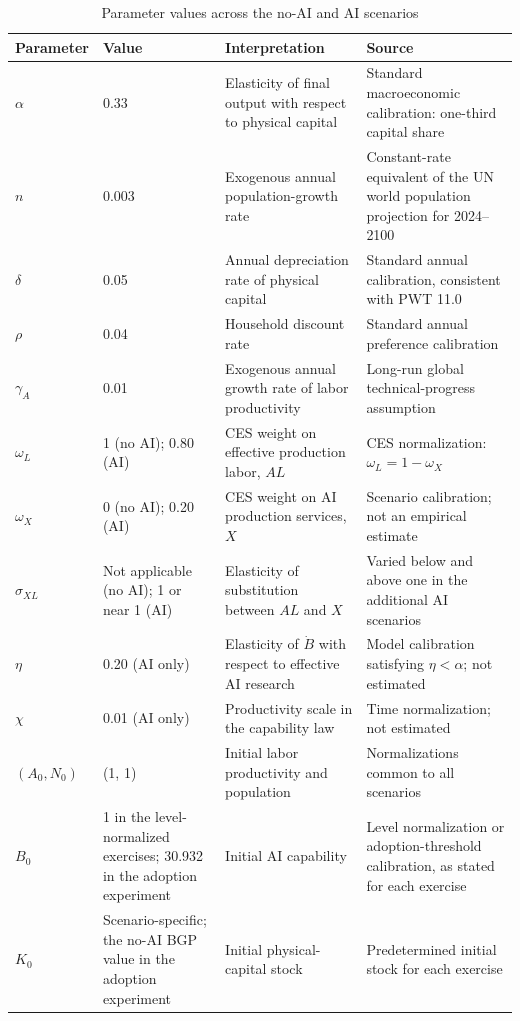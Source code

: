 \begin{table}[H]
\centering
\caption{Parameter values across the no-AI and AI scenarios}
\label{tab:axm-parameters}
\small
\setlength{\tabcolsep}{4pt}
\renewcommand{\arraystretch}{1.08}
\begin{tabular}{P{0.10\textwidth}P{0.20\textwidth}P{0.27\textwidth}P{0.32\textwidth}}
\toprule
Parameter & Value & Interpretation & Source\\
\midrule
\(\alpha\) & 0.33 & Elasticity of final output with respect to physical capital & Standard macroeconomic calibration: one-third capital share\\
\(n\) & 0.003 & Exogenous annual population-growth rate & Constant-rate equivalent of the UN world population projection for 2024--2100 \citep{unwpp2024}\\
\(\delta\) & 0.05 & Annual depreciation rate of physical capital & Standard annual calibration, consistent with PWT 11.0 \citep{pwt110}\\
\(\rho\) & 0.04 & Household discount rate & Standard annual preference calibration\\
\(\gamma_A\) & 0.01 & Exogenous annual growth rate of labor productivity & Long-run global technical-progress assumption \citep{oecdlongrun2025}\\
\(\omega_L\) & 1 (no AI); 0.80 (AI) & CES weight on effective production labor, \(AL\) & CES normalization: \(\omega_L=1-\omega_X\)\\
\(\omega_X\) & 0 (no AI); 0.20 (AI) & CES weight on AI production services, \(X\) & Scenario calibration; not an empirical estimate \citep{oecdaiinvestment2025,oecdproductivity2026}\\
\(\sigma_{XL}\) & Not applicable (no AI); 1 or near 1 (AI) & Elasticity of substitution between \(AL\) and \(X\) & Varied below and above one in the additional AI scenarios\\
\(\eta\) & 0.20 (AI only) & Elasticity of \(\dot B\) with respect to effective AI research & Model calibration satisfying \(\eta<\alpha\); not estimated\\
\(\chi\) & 0.01 (AI only) & Productivity scale in the capability law & Time normalization; not estimated\\
\((A_0,N_0)\) & (1, 1) & Initial labor productivity and population & Normalizations common to all scenarios\\
\(B_0\) & 1 in the level-normalized exercises; 30.932 in the adoption experiment & Initial AI capability & Level normalization or adoption-threshold calibration, as stated for each exercise\\
\(K_0\) & Scenario-specific; the no-AI BGP value in the adoption experiment & Initial physical-capital stock & Predetermined initial stock for each exercise\\
\bottomrule
\end{tabular}
\end{table}

